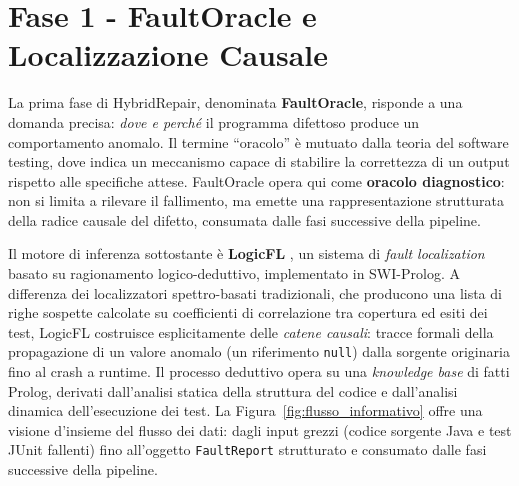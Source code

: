 \section{Fase 1 - FaultOracle e Localizzazione Causale}
\label{sec:fase1}

La prima fase di HybridRepair, denominata \textbf{FaultOracle}, risponde a una
domanda precisa: \textit{dove e perché} il programma difettoso produce un comportamento anomalo.
Il termine ``oracolo'' è mutuato dalla teoria del software testing, dove indica un meccanismo capace
di stabilire la correttezza di un output rispetto alle specifiche attese. FaultOracle opera qui come
\textbf{oracolo diagnostico}: non si limita a rilevare il fallimento, ma emette una rappresentazione
strutturata della radice causale del difetto, consumata dalle fasi successive della pipeline.

Il motore di inferenza sottostante è \textbf{LogicFL} \cite{kim2024identifying}, un sistema di \textit{fault localization} basato
su ragionamento logico-deduttivo, implementato in SWI-Prolog. A differenza dei localizzatori spettro-basati
tradizionali, che producono una lista di righe sospette calcolate su coefficienti di
correlazione tra copertura ed esiti dei test, LogicFL costruisce esplicitamente delle \textit{catene causali}:
tracce formali della propagazione di un valore anomalo (un riferimento \texttt{null}) dalla sorgente
originaria fino al crash a runtime. Il processo deduttivo opera su una \textit{knowledge base} di fatti
Prolog, derivati dall'analisi statica della struttura del codice e dall'analisi dinamica dell'esecuzione dei test.
\clearpage
La Figura~\ref{fig:flusso_informativo} offre una visione d'insieme del flusso dei dati: dagli input grezzi
(codice sorgente Java e test JUnit fallenti) fino all'oggetto \texttt{FaultReport} strutturato e consumato
dalle fasi successive della pipeline.


